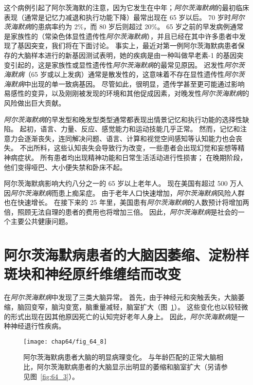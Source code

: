 这个病例引起了阿尔茨海默的注意，因为它发生在中年；\textit{阿尔茨海默病}的最初临床表现（通常是记忆力减退和执行功能下降）最常出现在 65 岁以后。
70 岁时\textit{阿尔茨海默病}的患病率约为 2\%，而 80 岁后则超过 20\%。
65 岁之前的早发病例通常是家族性的（常染色体显性遗传性\textit{阿尔茨海默病}），并且已经在其中许多患者中发现了基因突变，我们将在下面讨论。
事实上，最近对第一例阿尔茨海默病患者保存的大脑样本进行的新基因测试表明，她的疾病是由一种叫做早老素-1 的基因突变引起的，这是家族性或显性遗传性\textit{阿尔茨海默病}的最常见原因。
迟发性\textit{阿尔茨海默病}（65 岁或以上发病）通常是散发性的，这意味着不存在显性遗传性\textit{阿尔茨海默病}中出现的单一致病基因。
尽管如此，很明显，遗传学甚至更可能通过影响易感性的变异，以及刚刚被发现的环境和其他促成因素，对晚发性\textit{阿尔茨海默病}的风险做出巨大贡献。


\textit{阿尔茨海默病}的早发型和晚发型类型通常都表现出情景记忆和执行功能的选择性缺陷。
起初，语言、力量、反应、感觉能力和运动技能几乎正常。
然而，记忆和注意力会逐渐丧失，连同解决问题、语言、计算和视觉空间感知等认知能力也会丧失。
不出所料，这些认知丧失会导致行为改变，一些患者会出现幻觉和妄想等精神病症状。
所有患者均出现精神功能和日常生活活动进行性损害；
在晚期阶段，他们变得哑巴、大小便失禁和卧床不起。


阿尔茨海默病影响大约八分之一的 65 岁以上老年人。 现在美国有超过 500 万人因\textit{阿尔茨海默病}而患上痴呆症。
由于老年人口快速增加，\textit{阿尔茨海默病}风险人群也在快速增长。
在接下来的 25 年里，美国患有\textit{阿尔茨海默病}的人数预计将增加两倍，照顾无法自理的患者的费用也将增加三倍。
因此，\textit{阿尔茨海默病}是社会的一个主要公共健康问题。



\section{阿尔茨海默病患者的大脑因萎缩、淀粉样斑块和神经原纤维缠结而改变}

在\textit{阿尔茨海默病}中发现了三类大脑异常。
首先，由于神经元和突触丢失，大脑萎缩，脑回变窄，脑沟变宽，脑重量减轻，脑室扩大（图~\ref{fig:64_8}）。
这些变化也以较轻微的形式出现在因其他原因死亡的认知完好老年人身上。
因此，\textit{阿尔茨海默病}是一种神经退行性疾病。


\begin{figure}[htbp]
	\centering
	\texttt{[image: chap64/fig\_64\_8]}
	\caption{阿尔茨海默病患者大脑的明显病理变化。
		与年龄匹配的正常大脑相比，阿尔茨海默病患者的大脑显示出明显的萎缩和脑室扩大（另请参见图~\ref{fig:64_3}）。}
	\label{fig:64_8}
\end{figure}


